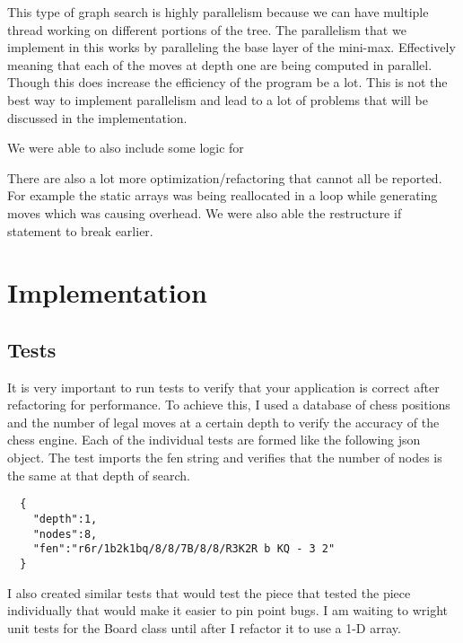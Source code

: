 \documentclass[sigconf]{acmart}
\begin{document}
This type of graph search is highly parallelism because we can have multiple thread working on different portions of the tree.
The parallelism that we implement in this works by paralleling the base layer of the mini-max.
Effectively meaning that each of the moves at depth one are being computed in parallel.
Though this does increase the efficiency of the program be a lot.
This is not the best way to implement parallelism and lead to a lot of problems that will be discussed in the implementation.

We were able to also include some logic for 

There are also a lot more optimization/refactoring that cannot all be reported.
For example the static arrays was being reallocated in a loop while generating moves which was causing overhead.
We were also able the restructure if statement to break earlier.

\section{Implementation}
\subsection{Tests}
It is very important to run tests to verify that your application is correct after refactoring for performance.
To achieve this, I used a database of chess positions \cite{jones} and the number of legal moves at a certain depth to verify the accuracy of the chess engine.
Each of the individual tests are formed like the following json object. 
The test imports the fen \cite{fen} string and verifies that the number of nodes is the same at that depth of search.
\begin{verbatim}
  {
    "depth":1,
    "nodes":8,
    "fen":"r6r/1b2k1bq/8/8/7B/8/8/R3K2R b KQ - 3 2"
  }
\end{verbatim}
I also created similar tests that would test the piece that tested the piece individually that would make it easier to pin point bugs.
I am waiting to wright unit tests for the Board class until after I refactor it to use a 1-D array.
\end{document}
